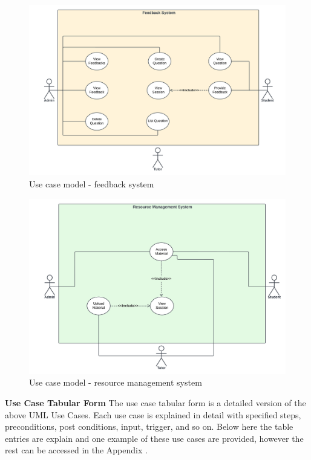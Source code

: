 \begin{justify}
\begin{figure}[H]
    \centerline{\includegraphics[width=150mm,scale=1]{figures/analysis_and_design/analysis/4. Feedback System.png}}
    \caption{Use case model - feedback system}
    \label{FeedbackSystem}
\end{figure}

\begin{figure}[H]
    \centerline{\includegraphics[width=150mm,scale=1]{figures/analysis_and_design/analysis/5. Resource Management System.png}}
    \caption{Use case model - resource management system}
    \label{ResourceManagementSystem}
\end{figure}

\clearpage
\newendline\textbf{Use Case Tabular Form}\newendline
The use case tabular form is a detailed version of the above UML Use Cases. Each use case is explained in detail with specified steps, preconditions, post conditions, input, trigger, and so on. Below here the table entries are explain and one example of these use cases are provided, however the rest can be accessed in the Appendix {\pageref{Appendix 1}}.\\


\end{justify}
